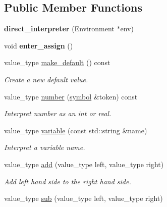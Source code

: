 \subsection*{Public Member Functions}
\begin{DoxyCompactItemize}
\item 
\mbox{\label{classdice_1_1direct__interpreter_ad3e8036bc24b3dfbbab129b6027ed566}} 
{\bfseries direct\+\_\+interpreter} (Environment $\ast$env)
\item 
\mbox{\label{classdice_1_1direct__interpreter_a6c73ce83530029db99ac213d9c4cf5ce}} 
void {\bfseries enter\+\_\+assign} ()
\item 
value\+\_\+type \mbox{\hyperlink{classdice_1_1direct__interpreter_abfb079c8c3c74ea3a572051ef9b91ad5}{make\+\_\+default}} () const
\begin{DoxyCompactList}\small\item\em Create a new default value. \end{DoxyCompactList}\item 
value\+\_\+type \mbox{\hyperlink{classdice_1_1direct__interpreter_a1ec4254bbc04f2893f27dba411102633}{number}} (\mbox{\hyperlink{structdice_1_1symbol}{symbol}} \&token) const
\begin{DoxyCompactList}\small\item\em Interpret number as an int or real. \end{DoxyCompactList}\item 
value\+\_\+type \mbox{\hyperlink{classdice_1_1direct__interpreter_af43cc50aa076ba0d94513b7a91b83c1f}{variable}} (const std\+::string \&name)
\begin{DoxyCompactList}\small\item\em Interpret a variable name. \end{DoxyCompactList}\item 
value\+\_\+type \mbox{\hyperlink{classdice_1_1direct__interpreter_a057b2d2b577b56077b04f223394323aa}{add}} (value\+\_\+type left, value\+\_\+type right)
\begin{DoxyCompactList}\small\item\em Add left hand side to the right hand side. \end{DoxyCompactList}\item 
value\+\_\+type \mbox{\hyperlink{classdice_1_1direct__interpreter_a5b7c35ce989972138c8f1f01ccdfec03}{sub}} (value\+\_\+type left, value\+\_\+type right)

\end{DoxyCompactItemize}
